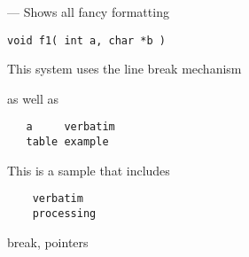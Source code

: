\startmanpage
{}
--- Shows all fancy formatting 
\startvb\begin{verbatim}
void f1( int a, char *b )

\end{verbatim}
\endvb

\par
{}
\par
{}
This system uses the line
\nextline
break mechanism
\nextline
\par
as well as
\begin{verbatim}
   a     verbatim
   table example
\end{verbatim}

\par
\par
{}
This is a sample that includes
\begin{verbatim}
    verbatim 
    processing
\end{verbatim}

\par
{}
break, pointers
\nextline
{}
\endmanpage
